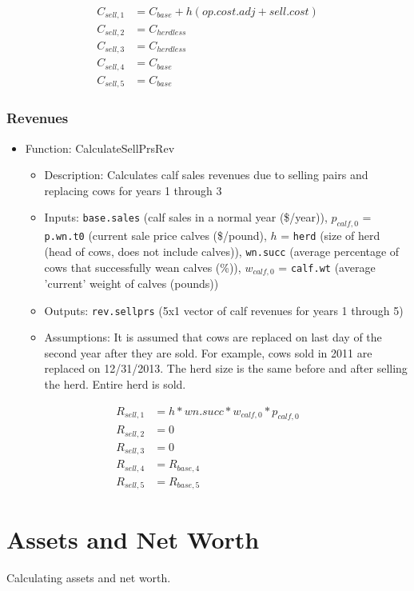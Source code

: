 \documentclass[11pt]{article}
\begin{document}
\begin{align*}
C_{sell, 1} &= C_{base} + h (op.cost.adj + sell.cost) \\
C_{sell, 2} &= C_{herdless} \\
C_{sell, 3} &= C_{herdless} \\
C_{sell, 4} &= C_{base} \\
C_{sell, 5} &= C_{base}
\end{align*}

\subsubsection{Revenues}
\begin{itemize}
\item   Function: CalculateSellPrsRev
	\begin{itemize}
	\item Description: Calculates calf sales revenues due to selling pairs and replacing cows for years 1 through 3
  	\item Inputs: \verb!base.sales! (calf sales in a normal year (\$/year)), $p_{calf, 0}$ = \verb!p.wn.t0! (current sale price calves (\$/pound), $h$ = \verb!herd! (size of herd (head of cows, does not include calves)), \verb!wn.succ! (average percentage of cows that successfully wean calves (\%)), $w_{calf, 0}$ = \verb!calf.wt! (average 'current' weight of calves (pounds))
  	\item Outputs: \verb!rev.sellprs! (5x1 vector of calf revenues for years 1 through 5)
  	\item Assumptions: It is assumed that cows are replaced on last day of the second year after they are sold. 
  For example, cows sold in 2011 are replaced on 12/31/2013. The herd size is the same before and after selling the herd. Entire herd is sold.
	\end{itemize}
\end{itemize}
\begin{align*}
R_{sell, 1} &= h * wn.succ * w_{calf, 0} * p_{calf, 0} \\
R_{sell, 2} &= 0 \\
R_{sell, 3} &= 0 \\
R_{sell, 4} &= R_{base, 4} \\
R_{sell, 5} &= R_{base, 5}
\end{align*}

\section{Assets and Net Worth}
Calculating assets and net worth.
\end{document}
